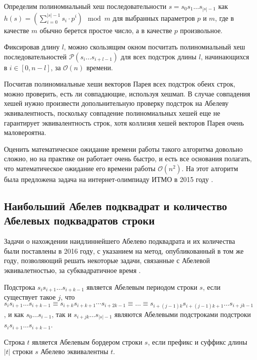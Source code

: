 Определим полиномиальный хеш последовательности $s=s_0s_1\ldots s_{|s|-1}$ как $h(s)=(\sum\limits_{i=0}^{|s|-1} s_i \cdot p^i) \mod{m}$ для выбранных параметров $p$ и $m$, где в качестве $m$ обычно берется простое число, а в качестве $p$ произвольное.

Фиксировав длину $l$, можно скользящим окном посчитать полиномиальный хеш последовательностей $\mathcal{P}(s_i\ldots s_{i+l-1})$ для всех подстрок длины $l$, начинающихся в $i \in [0, n-l]$, за $\mathcal{O}(n)$ времени.

Посчитав полиномиальные хеши векторов Парея всех подстрок обеих строк, можно проверить, есть ли совпадающие, используя хешмап. В случае совпадения хешей нужно произвести допольнительную проверку подстрок на Абелеву эквивалентность, поскольку совпадение полиномиальных хешей еще не гарантирует эквивалентность строк, хотя коллизия хешей векторов Парея очень маловероятна.

Оценить математическое ожидание времени работы такого алгоритма довольно сложно, но на практике он работает очень быстро, и есть все основания полагать, что математическое ожидание его времени работы $\mathcal{O}(n^2)$. На этот алгоритм была предложена задача на интернет-олимпиаду ИТМО в 2015 году \cite{6}.

\subsection{Наибольший Абелев подквадрат и количество Абелевых подквадратов строки}
Задачи о нахождении наидлиннейшего Абелево подквадрата и их количества были поставлены в 2016 году, с указанием на метод, опубликованный в том же году, позволяющий решать некоторые задачи, связанные с Абелевой эквивалетностью, за субквадратичное время \cite{5}.

\begin{definition}
Подстрока $s_i s_{i+1} \ldots s_{i+k-1}$ является Абелевым периодом строки $s$, если существует такое $j$, что $s_i s_{i+1} \ldots s_{i+k-1} \equiv s_{i+k} s_{i+k+1} \cdots s_{i+2k-1} \equiv \ldots \equiv s_{i+(j-1)k} s_{i+(j-1)k+1} \ldots s_{i+jk-1}$, и как $s_0 \ldots s_{i-1}$, так и $s_{i+jk} \ldots s_{|s|-1}$ являются Абелевыми подстроками подстроки $s_i s_{i+1} \ldots s_{i+k-1}$.
\end{definition}

\begin{definition}
Строка $t$ является Абелевым бордером строки $s$, если префикс и суффикс длины $|t|$ строки $s$ Абелево эквивалентны $t$.
\end{definition}


